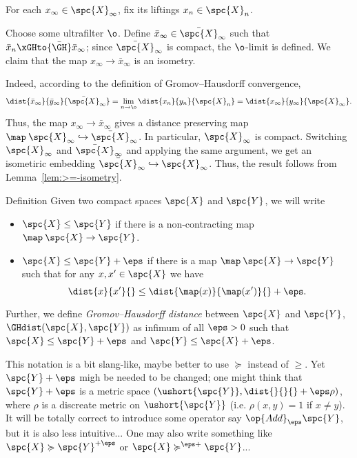 For each $x_\infty\in\spc{X}_\infty$,
fix its liftings $x_n\in\spc{X}_n$.

Choose some ultrafilter $\o$.
Define $\bar x_\infty\in \bar{\spc{X}}_\infty$ such that $\bar x_n\xGHto{\bar\GH}\bar x_\infty$;
since $\bar{\spc{X}}_\infty$ is compact, the $\o$-limit is defined.
We claim that the map $x_\infty\to \bar x_\infty$ is an isometry.

Indeed, according to the definition of Gromov--Hausdorff convergence, 
\[\dist{\bar x_\infty}{\bar y_\infty}{\bar{\spc{X}}_\infty}
=
\lim_{n\to\o}\dist{x_n}{y_n}{\spc{X}_n}
=
\dist{x_\infty}{y_\infty}{\spc{X}_\infty}.
\]
Thus, the map $x_\infty\to\bar x_\infty$ gives a distance preserving map
$\map\:\spc{X}_\infty\hookrightarrow\bar{\spc{X}}_\infty$.
In particular,  
$\spc{X}_\infty$ is compact.
Switching $\spc{X}_\infty$ and $\bar{\spc{X}}_\infty$ and applying the same argument, 
we get an isometiric embedding 
$\bar{\spc{X}}_\infty\hookrightarrow\spc{X}_\infty$.
Thus, the result follows from Lemma~\ref{lem:>=-isometry}.
\qeds




\begin{thm}{Definition}
 Given two compact spaces $\spc{X}$ and $\spc{Y}$, we will write 
\begin{itemize}
\item $\spc{X}\le \spc{Y}$ if there is a non-contracting map $\map\:\spc{X}\to \spc{Y}$.
\item $\spc{X}\le \spc{Y}+\eps$ if there is a map $\map\:\spc{X}\to \spc{Y}$ such that for any $x,x'\in \spc{X}$ we have
\[\dist{x}{x'}{}\le \dist{\map(x)}{\map(x')}{}+\eps.\]
\end{itemize}

Further, we define \emph{Gromov--Hausdorff distance} between $\spc{X}$ and $\spc{Y}$, $\GHdist(\spc{X},\spc{Y})$ as infimum of all $\eps>0$ such that
$\spc{X}\le \spc{Y}+\eps$ and $\spc{Y}\le \spc{X}+\eps$.
\end{thm}

This notation is a bit slang-like, maybe better to use $\succcurlyeq$ instead of $\ge$.
Yet $\spc{Y}+\eps$ migh be needed to be changed;
one might think that $\spc{Y}+\eps$ is a metric space $(\ushort{\spc{Y}},\dist{}{}{}+\eps \rho)$, where $\rho$ is a discreate metric on $\ushort{\spc{Y}}$ (i.e. $\rho(x,y)=1$ if $x\not=y$). 
It will be totally correct to introduce some operator say $\op{Add}_\eps\spc{Y}$, but it is also less intuitive...
One may also write something like 
$\spc{X}\succcurlyeq \spc{Y}^{+\eps}$ or $\spc{X}\succcurlyeq^{\eps+} \spc{Y}$...

